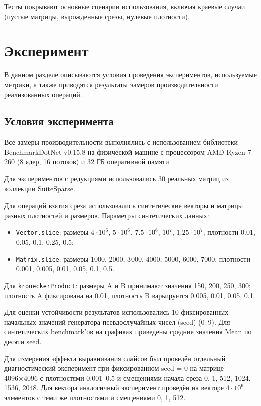 \documentclass[a4paper]{article}
\begin{document}
Тесты покрывают основные сценарии использования, включая краевые случаи (пустые матрицы, вырожденные срезы, нулевые плотности).

\section{Эксперимент}

В данном разделе описываются условия проведения экспериментов, используемые метрики, а также приводятся результаты замеров производительности реализованных операций.

\subsection{Условия эксперимента}

Все замеры производительности выполнялись с использованием библиотеки BenchmarkDotNet v0.15.8 на физической машине с процессором AMD Ryzen 7 260 (8 ядер, 16 потоков) и 32 ГБ оперативной памяти. 

Для экспериментов с редукциями использовались 30 реальных матриц из коллекции SuiteSparse.

Для операций взятия среза использовались синтетические векторы и матрицы разных плотностей и размеров. Параметры синтетических данных:
\begin{itemize}
    \item \texttt{Vector.slice}: размеры \(4\cdot10^6\), \(5\cdot10^6\), \(7.5\cdot10^6\), \(10^7\), \(1.25\cdot10^7\); плотности 0.01, 0.05, 0.1, 0.25, 0.5;
    \item \texttt{Matrix.slice}: размеры 1000, 2000, 3000, 4000, 5000, 6000, 7000; плотности 0.001, 0.005, 0.01, 0.05, 0.1, 0.5.
\end{itemize}

Для \texttt{kroneckerProduct}: размеры A и B принимают значения 150, 200, 250, 300; плотность A фиксирована на 0.01, плотность B варьируется 0.005, 0.01, 0.05, 0.1. 

Для оценки устойчивости результатов использовались 10 фиксированных начальных значений генератора псевдослучайных чисел (seed) (0--9). Для синтетических benchmark'ов на графиках приведены средние значения Mean по десяти seed.

Для измерения эффекта выравнивания слайсов был проведён отдельный диагностический эксперимент при фиксированном seed = 0 на матрице 4096×4096 с плотностями 0.001--0.5 и смещениями начала среза 0, 1, 512, 1024, 1536, 2048. Для вектора аналогичный эксперимент проведён на векторе \(4\cdot10^6\) элементов с теми же плотностями и смещениями 0, 1, 512.
\end{document}
